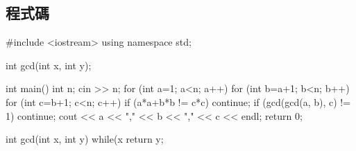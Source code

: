\subsection{程式碼}
\begin{cppcode}
	#include <iostream>
	using namespace std;
	
	int gcd(int x, int y);
	
	int main() 
	{
		int n;
		cin >> n;
		for (int a=1; a<n; a++) {
			for (int b=a+1; b<n; b++) {
				for (int c=b+1; c<n; c++) {
					if (a*a+b*b != c*c) continue;
					if (gcd(gcd(a, b), c) != 1) continue;
					cout << a << "," << b << "," << c << endl;	
				}
			}
		}
		return 0;
	}

	int gcd(int x, int y) {
		while(x%
		return y;				
	}
\end{cppcode}
